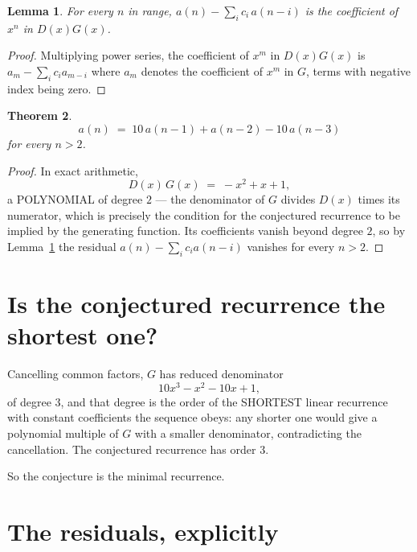 \documentclass[11pt,a4paper]{article}
\theoremstyle{plain}
\newtheorem{theorem}{Theorem}
\newtheorem{lemma}[theorem]{Lemma}
\theoremstyle{definition}
\begin{document}
\begin{lemma}\label{lem:key}
For every $n$ in range, $a(n)-\sum_i c_i\,a(n-i)$ is the coefficient of $x^{n}$ in
$D(x)G(x)$.
\end{lemma}

\begin{proof}
Multiplying power series, the coefficient of $x^{m}$ in $D(x)G(x)$ is
$a_m-\sum_i c_i a_{m-i}$ where $a_m$ denotes the coefficient of $x^{m}$ in $G$, terms with
negative index being zero.
\end{proof}

\begin{theorem}
\[
a(n)\;=\;10\,a(n-1) + a(n-2) - 10\,a(n-3)
\]
for every $n>2$.
\end{theorem}

\begin{proof}
In exact arithmetic,
\[
D(x)\,G(x)\;=\;- x^{2} + x + 1,
\]
a POLYNOMIAL of degree $2$ --- the denominator of $G$ divides $D(x)$ times its numerator,
which is precisely the condition for the conjectured recurrence to be implied by the
generating function. Its coefficients vanish beyond degree $2$, so by
Lemma~\ref{lem:key} the residual $a(n)-\sum_ic_ia(n-i)$ vanishes for every
$n>2$.
\end{proof}

\section{Is the conjectured recurrence the shortest one?}

Cancelling common factors, $G$ has reduced denominator
\[
10 x^{3} - x^{2} - 10 x + 1,
\]
of degree $3$, and that degree is the order of the SHORTEST linear recurrence with
constant coefficients the sequence obeys: any shorter one would give a polynomial multiple of
$G$ with a smaller denominator, contradicting the cancellation. The conjectured recurrence has
order $3$.

So the conjecture is the minimal recurrence.

\section{The residuals, explicitly}
\end{document}
